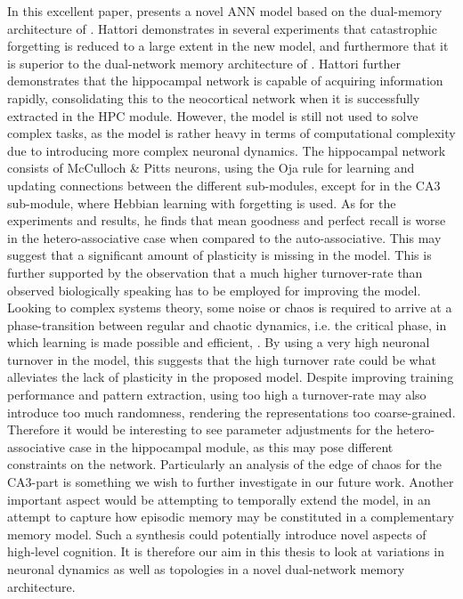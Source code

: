 In this excellent paper, \cite{Hattori2014} presents a novel ANN model based on the dual-memory architecture of \cite{McClelland1995}. Hattori demonstrates in several experiments that catastrophic forgetting is reduced to a large extent in the new model, and furthermore that it is superior to the dual-network memory architecture of \cite{Ans1997, French1997, Hattori2010}. Hattori further demonstrates that the hippocampal network is capable of acquiring information rapidly, consolidating this to the neocortical network when it is successfully extracted in the HPC module.
However, the model is still not used to solve complex tasks, as the model is rather heavy in terms of computational complexity due to introducing more complex neuronal dynamics. The hippocampal network consists of McCulloch \& Pitts neurons, using the Oja rule for learning and updating connections between the different sub-modules, except for in the CA3 sub-module, where Hebbian learning with forgetting is used.
As for the experiments and results, he finds that mean goodness and perfect recall is worse in the hetero-associative case when compared to the auto-associative. This may suggest that a significant amount of plasticity is missing in the model. This is further supported by the observation that a much higher turnover-rate than observed biologically speaking has to be employed for improving the model. Looking to complex systems theory, some noise or chaos is required to arrive at a phase-transition between regular and chaotic dynamics, i.e. the critical phase, in which learning is made possible and efficient, \cite{Langton1990, Newman2003}. By using a very high neuronal turnover in the model, this suggests that the high turnover rate could be what alleviates the lack of plasticity in the proposed model. Despite improving training performance and pattern extraction, using too high a turnover-rate may also introduce too much randomness, rendering the representations too coarse-grained. Therefore it would be interesting to see parameter adjustments for the hetero-associative case in the hippocampal module, as this may pose different constraints on the network. Particularly an analysis of the edge of chaos for the CA3-part is something we wish to further investigate in our future work. Another important aspect would be attempting to temporally extend the model, in an attempt to capture how episodic memory may be constituted in a complementary memory model. Such a synthesis could potentially introduce novel aspects of high-level cognition. It is therefore our aim in this thesis to look at variations in neuronal dynamics as well as topologies in a novel dual-network memory architecture.



